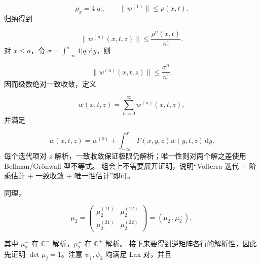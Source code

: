 \documentclass[
    lang=cn,
    scheme=chinese,
    mode=simple,
    device=normal,
    color=blue,
    math=cm,
    thmcnt=section,
    12pt
]{elegantbook}
\begin{document}
\begin{callout}
    \begin{equation}
        \rho_x=4\lvert q\rvert,
        \qquad
        \lVert w^{(1)}\rVert\le\rho(x,t).
        \tag{5.2.14}
        \label{eq:5.2.14}
    \end{equation}
    归纳得到

    \begin{equation}
        \lVert w^{(n)}(x,t,z)\rVert
        \le
        \dfrac{\rho^n(x,t)}{n!}.
        \tag{5.2.15}
        \label{eq:5.2.15}
    \end{equation}
    对 $x\le a$，令 $\sigma=\displaystyle\int_{-\infty}^{a}4\lvert q\rvert\,\mathrm dy$，则

    \begin{equation}
        \lVert w^{(n)}(x,t,z)\rVert
        \le
        \dfrac{\sigma^n}{n!}.
        \tag{5.2.16}
        \label{eq:5.2.16}
    \end{equation}
    因而级数绝对一致收敛，定义

    \begin{equation}
        w(x,t,z)
        =
        \sum\limits_{n=0}^{\infty}w^{(n)}(x,t,z),
        \tag{5.2.17}
        \label{eq:5.2.17}
    \end{equation}
    并满足

    \begin{equation}
        w(x,t,z)
        =
        w^{(0)}
        +
        \int_{-\infty}^{x}
        F(x,y,z)w(y,t,z)\,\mathrm dy.
        \tag{5.2.18}
        \label{eq:5.2.18}
    \end{equation}
    每个迭代项对 $z$ 解析，一致收敛保证极限仍解析；唯一性则对两个解之差使用 Bellman/Grönwall 型不等式。
    组会上不需要展开证明，说明``Volterra 迭代 + 阶乘估计 + 一致收敛 + 唯一性估计''即可。
\end{callout}

同理，

\begin{equation}
    \mu_2
    =
    \begin{pmatrix}
        \mu_2^{(11)} & \mu_2^{(12)} \\
        \mu_2^{(21)} & \mu_2^{(22)}
    \end{pmatrix}
    =
    (\mu_2^-,\mu_2^+),
    \tag{5.2.19}
    \label{eq:5.2.19}
\end{equation}

其中 $\mu_2^-$ 在 $\mathbb{C}^-$ 解析，$\mu_2^+$ 在 $\mathbb{C}^+$ 解析。
接下来要得到逆矩阵各行的解析性，因此先证明 $\det\mu_j=1$。注意 $\psi_1,\psi_2$ 均满足 Lax 对，并且
\end{document}

